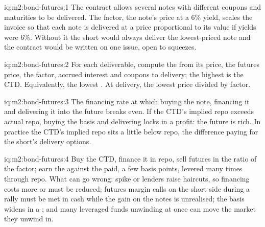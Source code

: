 \begin{solution}{iq:m2:bond-futures:1}
The contract allows several notes with different coupons and maturities to be
delivered. The factor, the note's price at a 6\% yield, scales the invoice so
that each note is delivered at a price proportional to its value if yields
were 6\%. Without it the short would always deliver the lowest-priced note and
the contract would be written on one issue, open to squeezes.
\end{solution}

\begin{solution}{iq:m2:bond-futures:2}
For each deliverable, compute the  from its price, the futures
price, the factor, accrued interest and coupons to delivery; the highest is
the CTD. Equivalently, the lowest . At delivery, the lowest price
divided by factor.
\end{solution}

\begin{solution}{iq:m2:bond-futures:3}
The financing rate at which buying the note, financing it and delivering it
into the future breaks even. If the CTD's implied repo exceeds actual repo,
buying the basis and delivering locks in a profit: the future is rich. In
practice the CTD's implied repo sits a little below repo, the difference paying
for the short's delivery options.
\end{solution}

\begin{solution}{iq:m2:bond-futures:4}
Buy the CTD, finance it in repo, sell futures in the ratio of the factor;
earn the  against the  paid, a few basis points,
levered many times through repo. What can go wrong:  spike or
lenders raise haircuts, so financing costs more or must be reduced; futures
margin calls on the short side during a rally must be met in cash while the
gain on the notes is unrealised; the basis widens in a ; and many
leveraged funds unwinding at once can move the market they unwind in.
\end{solution}

